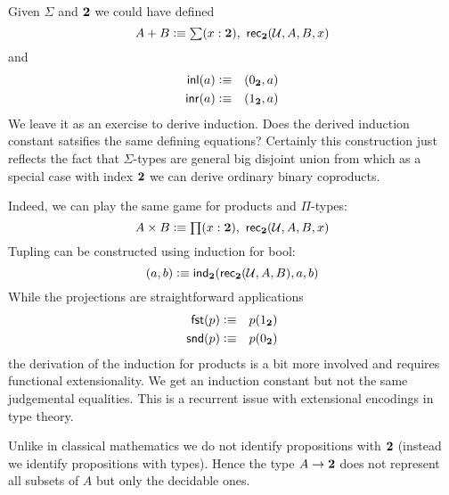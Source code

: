 Given $\Sigma$ and $\mathbf{2}$ we could have defined
\[ A + B \defeq \sm{x:\bool} \rec{\bool}(\UU,A,B,x) \]
and
\begin{eqnarray*}
  \mathsf{inl}(a) & \vcentcolon\equiv & ( 0_{\mathbf{2}},a) \\
  \mathsf{inr}(a) & \vcentcolon\equiv & ( 1_{\mathbf{2}},a) \\
\end{eqnarray*}
We leave it as an exercise to derive induction. Does the derived
induction constant satsifies the same defining equations?
Certainly this construction just reflects the fact that
$\Sigma$-types are general big disjoint union from which as a
special case with index $\mathbf{2}$ we can derive ordinary binary
coproducts. 

Indeed, we can play the same game for products and $\Pi$-types:
\[ A \times B \defeq \prd{x:\bool}\rec{\bool}(\UU,A,B,x) \]
Tupling can be constructed using induction for bool:
\[ ( a,b) \vcentcolon\equiv \mathsf{ind}_{\mathbf{2}}(\mathsf{rec}_{\mathbf{2}}(\mathcal{U},A,B),a,b) \]
While the projections are straightforward applications
\begin{eqnarray*}
  \mathsf{fst}(p) & \vcentcolon\equiv & p(1_{\mathbf{2}}) \\
  \mathsf{snd}(p) & \vcentcolon\equiv & p(0_{\mathbf{2}}) \\
\end{eqnarray*}
the derivation of the induction for products is a bit more
involved and requires functional extensionality. We get an
induction constant but not the same judgemental equalities.
This is a recurrent issue with extensional encodings in type
theory. 

Unlike in classical mathematics we
do not identify propositions with $\mathbf{2}$ (instead we identify
propositions with types). Hence the type $A \to \mathbf{2}$ does not
represent all subsets of $A$ but only the decidable ones.



